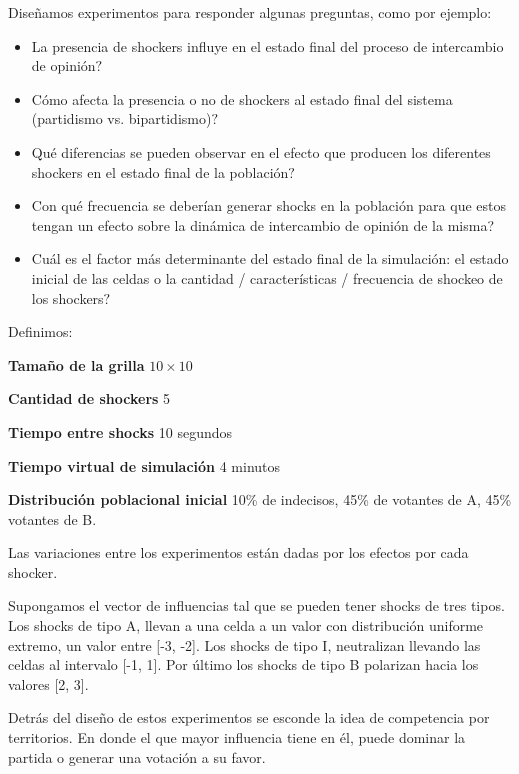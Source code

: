 Diseñamos experimentos para responder algunas preguntas, como por ejemplo:
\begin{itemize}
\item La presencia de shockers influye en el estado final del proceso de intercambio de opinión$?$ 
\item Cómo afecta la presencia o no de shockers al estado final del sistema (partidismo vs. bipartidismo)$?$ 
\item Qué diferencias se pueden observar en el efecto que producen los diferentes shockers en el estado final de la población$?$ 
\item Con qué frecuencia se deberían generar shocks en la población para que estos tengan un efecto sobre la dinámica de intercambio de opinión de la misma?
\item Cuál es el factor más determinante del estado final de la simulación: el estado inicial de las celdas o la cantidad / características / frecuencia de shockeo de los shockers$?$ 
\end{itemize}

Definimos:

\begin{description}
    \item \textbf{Tamaño de la grilla}  $10 \times 10$
    \item \textbf{Cantidad de shockers} 5
    \item \textbf{Tiempo entre shocks} 10 segundos
    \item \textbf{Tiempo virtual de simulación} 4 minutos
    \item \textbf{Distribución poblacional inicial} 10\% de indecisos, 45\% de votantes de A, 45\% votantes de B.
\end{description}

Las variaciones entre los experimentos están dadas por los efectos por cada shocker.

Supongamos el vector de influencias tal que se pueden tener shocks de tres
tipos. Los shocks de tipo A, llevan a una celda a un valor con distribución
uniforme extremo, un valor entre [-3, -2]. Los shocks de tipo I, neutralizan
llevando las celdas al intervalo  [-1, 1]. Por último los shocks de tipo B
polarizan hacia los valores [2, 3].

Detrás del diseño de estos experimentos se esconde la idea de competencia por
territorios. En donde el que mayor influencia tiene en él, puede dominar la
partida o generar una votación a su favor.

